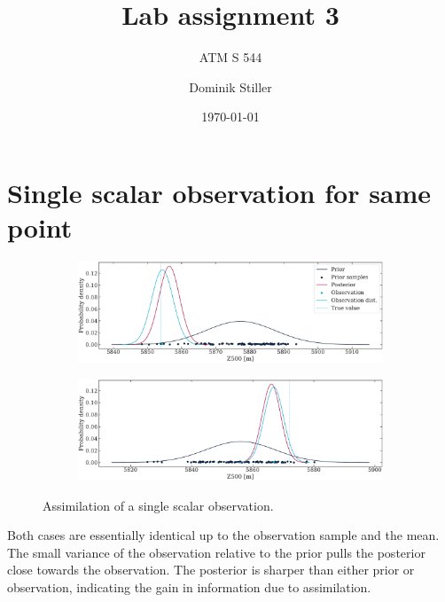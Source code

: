 \documentclass[parskip=half,DIV=16]{scrartcl}
\title{Lab assignment 3}
\subtitle{ATM S 544}
\author{Dominik Stiller}
\date{\today}
\begin{document}
\maketitle




\section{Single scalar observation for same point}

\begin{figure}[h]
    \centering
 
    \begin{subfigure}[c]{\textwidth}
       \includegraphics[width=\textwidth]{figures/single_point1.pdf}
    \end{subfigure}
     
    \bigskip
     
    \begin{subfigure}[c]{\textwidth}
       \includegraphics[width=\textwidth]{figures/single_point2.pdf}
      \label{fig:single-scalar-2}
    \end{subfigure}
 
    \caption{Assimilation of a single scalar observation.}
 \end{figure}

 Both cases are essentially identical up to the observation sample and the mean. The small variance of the observation relative to the prior pulls the posterior close towards the observation. The posterior is sharper than either prior or observation, indicating the gain in information due to assimilation.
\end{document}

